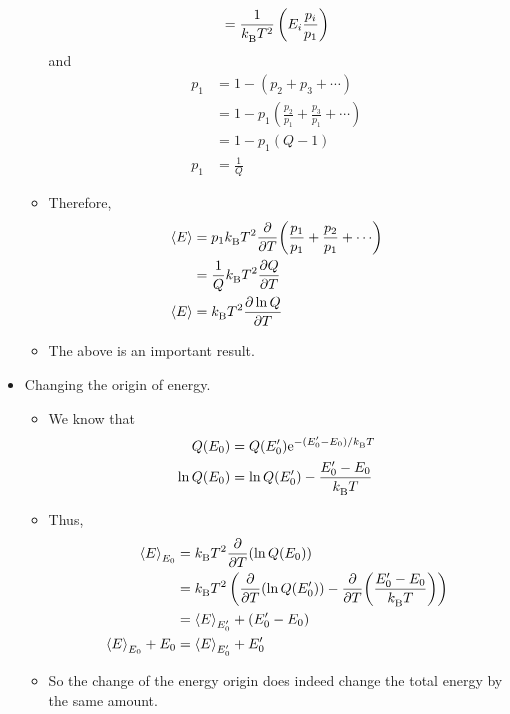 \documentclass[../notes.tex]{subfiles}
\begin{document}
\begin{itemize}
\begin{itemize}
\begin{equation*}
            = \frac{1}{\kB T^2}\left( E_i\frac{p_i}{p_1} \right)
        \end{equation*}
        and
        \begin{align*}
            p_1 &= 1-(p_2+p_3+\cdots)\\
            &= 1-p_1\left( \frac{p_2}{p_1}+\frac{p_3}{p_1}+\cdots \right)\\
            &= 1-p_1(Q-1)\\
            p_1 &= \frac{1}{Q}
        \end{align*}
        \item Therefore,
        \begin{align*}
            \prb{E} &= p_1\kB T^2\pdv{T}(\frac{p_1}{p_1}+\frac{p_2}{p_1}+\cdots)\\
            &= \frac{1}{Q}\kB T^2\pdv{Q}{T}\\
            \prb{E} &= \kB T^2\pdv{\ln Q}{T}
        \end{align*}
        \item The above is an important result.
    \end{itemize}
    \item Changing the origin of energy.
    \begin{itemize}
        \item We know that
        \begin{align*}
            Q(E_0) &= Q(E_0')\e[-(E_0'-E_0)/\kB T]\\
            \ln Q(E_0) &= \ln Q(E_0')-\frac{E_0'-E_0}{\kB T}
        \end{align*}
        \item Thus,
        \begin{align*}
            \prb{E}_{E_0} &= \kB T^2\pdv{T}(\ln Q(E_0))\\
            &= \kB T^2\left( \pdv{T}(\ln Q(E_0'))-\pdv{T}(\frac{E_0'-E_0}{\kB T}) \right)\\
            &= \prb{E}_{E_0'}+(E_0'-E_0)\\
            \prb{E}_{E_0}+E_0 &= \prb{E}_{E_0'}+E_0'
        \end{align*}
        \item So the change of the energy origin does indeed change the total energy by the same amount.
    \end{itemize}
\end{itemize}
\end{document}
